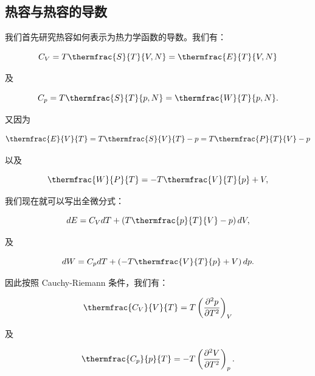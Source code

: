 \subsection{热容与热容的导数}
我们首先研究热容如何表示为热力学函数的导数。我们有：\begin{linenomath}\begin{equation}
C_V = T\thermfrac{S}{T}{V,N} = \thermfrac{E}{T}{V,N}
\end{equation}\end{linenomath}及\begin{linenomath}\begin{equation}
C_p = T\thermfrac{S}{T}{p,N} = \thermfrac{W}{T}{p,N}.
\end{equation}\end{linenomath}
又因为\begin{linenomath}\begin{equation}
\thermfrac{E}{V}{T} = T\thermfrac{S}{V}{T}-p=T\thermfrac{P}{T}{V}-p
\end{equation}\end{linenomath}以及
\begin{linenomath}\begin{equation}
\thermfrac{W}{P}{T} = -T\thermfrac{V}{T}{p}+V,
\end{equation}\end{linenomath}
我们现在就可以写出全微分式：
\begin{linenomath}\begin{equation}
dE = C_VdT + \left( T\thermfrac{p}{T}{V}-p \right)dV,
\end{equation}\end{linenomath}及
\begin{linenomath}\begin{equation}
dW = C_pdT + \left( -T\thermfrac{V}{T}{p}+V \right)dp.
\end{equation}\end{linenomath}
因此按照 Cauchy-Riemann 条件，我们有：
\begin{linenomath}\begin{equation}
\thermfrac{C_V}{V}{T} = T \left( \frac{\partial^2 p }{\partial T^2} \right)_V
\end{equation}\end{linenomath}
及
\begin{linenomath}\begin{equation}
\thermfrac{C_p}{p}{T} = -T \left( \frac{\partial^2 V }{\partial T^2} \right)_p.
\end{equation}\end{linenomath}
